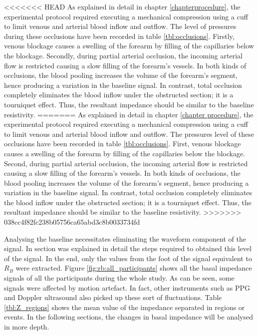 
<<<<<<< HEAD
As explained in detail in chapter \ref{chapterprocedure}, the experimental protocol required executing a mechanical compression using a cuff to limit venous and arterial blood inflow and outflow. The level of pressures during these occlusions have been recorded in table \ref{tbl:occlusions}. Firstly, venous blockage causes a swelling of the forearm by filling of the capillaries below the blockage. Secondly, during partial arterial occlusion, the incoming arterial flow is restricted causing a slow filling of the forearm's vessels. In both kinds of occlusions, the blood pooling increases the volume of the forearm's segment, hence producing a variation in the baseline signal. In contrast, total occlusion completely eliminates the blood inflow under the obstructed section; it is a tourniquet effect. Thus, the resultant impedance should be similar to the baseline resistivity.
=======
As explained in detail in chapter \ref{chapter procedure}, the experimental protocol required executing a mechanical compression using a cuff to limit venous and arterial blood inflow and outflow. The pressures level of these occlusions have been recorded in table \ref{tbl:occlusions}. First, venous blockage causes a swelling of the forearm by filling of the capillaries below the blockage. Second, during partial arterial occlusion, the incoming arterial flow is restricted causing a slow filling of the forearm's vessels. In both kinds of occlusions, the blood pooling increases the volume of the forearm's segment, hence producing a variation in the baseline signal. In contrast, total occlusion completely eliminates the blood inflow under the obstructed section; it is a tourniquet effect. Thus, the resultant impedance should be similar to the baseline resistivity.
>>>>>>> 038cc4f82fc238b05756ca65abd3c8b0033734fd

Analysing the baseline necessitates eliminating the waveform component of the signal. In section  was explained in detail the steps required to obtained this level of the signal. In the end, only the values from the foot of the signal equivalent to $R_B$ were extracted. Figure \ref{fig:rb:all_participants} shows all the basal impedance signals of all the participants during the whole study. As can be seen, some signals were affected by motion artefact. In fact, other instruments such as PPG and Doppler ultrasound also picked up these sort of fluctuations. Table \ref{tbl:Z_regions} shows the mean value of the impedance separated in regions or events. In the following sections, the changes in basal impedance will be analysed in more depth. 

